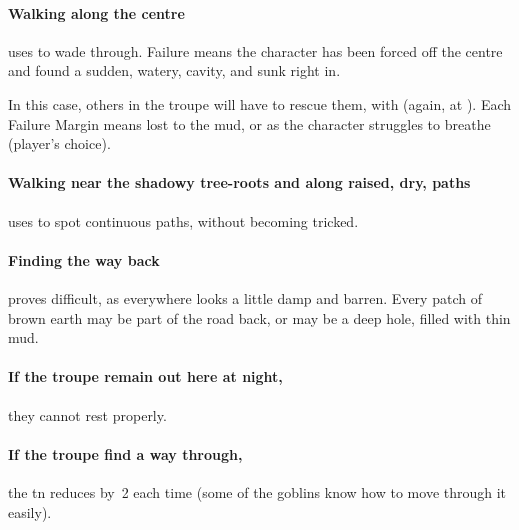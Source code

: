 \paragraph{Walking along the centre}
uses  to wade through.
Failure means the character has been forced off the centre and found a sudden, watery, cavity, and sunk right in.

In this case, others in the troupe will have to rescue them, with  (again, at \tn[10]).
Each Failure Margin means  lost to the mud, or  as the character struggles to breathe (player's choice).

\paragraph{Walking near the shadowy tree-roots and along raised, dry, paths}
uses  to spot continuous paths, without becoming tricked.

\paragraph{Finding the way back}
proves difficult, as everywhere looks a little damp and barren.
Every patch of brown earth may be part of the road back, or may be a deep hole, filled with thin mud.

\paragraph{If the troupe remain out here at night,}
they cannot rest properly.

\paragraph{If the troupe find a way through,}
the \gls{tn} reduces by~2 each time (some of the goblins know how to move through it easily).

\stopcontents[sq]

